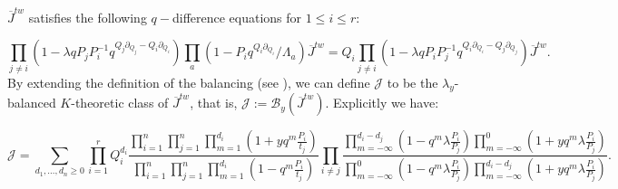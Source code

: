 \documentclass{amsart}
\begin{document}
$\overline{J}^{tw}$ satisfies the following $q-$difference equations for $1 \leq i \leq r$:


$$\prod_{j\neq i} (1-\lambda qP_jP_i^{-1}q^{Q_j\partial_{Q_j}-Q_i\partial_{Q_i}})\prod_a(1-P_iq^{Q_i\partial_{Q_i}}/\Lambda_a)\overline{J}^{tw}=Q_i\prod_{j\neq i}(1-\lambda qP_iP_j^{-1}q^{Q_i\partial_{Q_i}-Q_j\partial_{Q_j}})\overline{J}^{tw}.$$
By extending the definition of the balancing (see ), we can define $\mathcal{J}$ to be the $\lambda_y$-balanced $K$-theoretic class of $\overline{J}^{tw}$, that is, $\mathcal{J} := \mathcal{B}_y(\overline{J}^{tw})$. Explicitly we have:

$$\mathcal{J}=\sum_{d_1,\dots,d_n\geq 0}\prod_{i=1}^rQ_i^{d_i}\frac{\prod_{i=1}^n\prod_{j=1}^{n}\prod_{m=1}^{d_i}(1+yq^m\frac{P_i}{t_j})}{\prod_{i=1}^n\prod_{j=1}^{n}\prod_{m=1}^{d_i}(1-q^m\frac{P_i}{t_j})}\prod_{i\neq j}\frac{\prod_{m=-\infty}^{d_i-d_j} (1-q^m\lambda\frac{P_i}{P_j})\prod_{m=-\infty}^{0} (1+yq^m\lambda\frac{P_i}{P_j})}{\prod_{m=-\infty}^{0} (1-q^m\lambda\frac{P_i}{P_j}) \prod_{m=-\infty}^{d_i-d_j} (1+yq^m\lambda\frac{P_i}{P_j})}.$$
\end{document}
